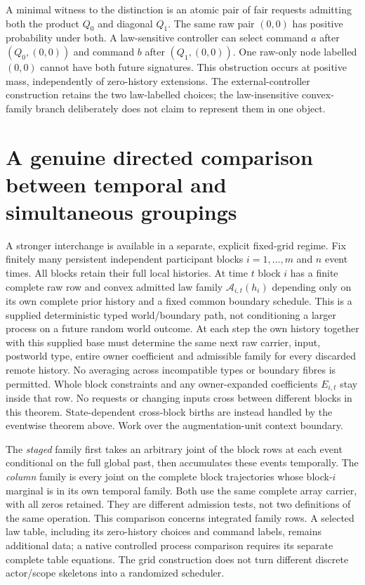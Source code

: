 \documentclass[11pt]{article}\usepackage{amsmath,amssymb,amsthm,geometry}\geometry{margin=1in}
\begin{document}
A minimal witness to the distinction is an atomic pair of fair requests admitting both the product $Q_0$ and diagonal $Q_1$. The same raw pair $(0,0)$ has positive probability under both. A law-sensitive controller can select command $a$ after $(Q_0,(0,0))$ and command $b$ after $(Q_1,(0,0))$. One raw-only node labelled $(0,0)$ cannot have both future signatures. This obstruction occurs at positive mass, independently of zero-history extensions. The external-controller construction retains the two law-labelled choices; the law-insensitive convex-family branch deliberately does not claim to represent them in one object.

\section{A genuine directed comparison between temporal and simultaneous groupings}
A stronger interchange is available in a separate, explicit fixed-grid regime. Fix finitely many persistent independent participant blocks $i=1,\ldots,m$ and $n$ event times. All blocks retain their full local histories. At time $t$ block $i$ has a finite complete raw row and convex admitted law family $\mathcal A_{i,t}(h_i)$ depending only on its own complete prior history and a fixed common boundary schedule. This is a supplied deterministic typed world/boundary path, not conditioning a larger process on a future random world outcome. At each step the own history together with this supplied base must determine the same next raw carrier, input, postworld type, entire owner coefficient and admissible family for every discarded remote history. No averaging across incompatible types or boundary fibres is permitted. Whole block constraints and any owner-expanded coefficients $E_{i,t}$ stay inside that row. No requests or changing inputs cross between different blocks in this theorem. State-dependent cross-block births are instead handled by the eventwise theorem above. Work over the augmentation-unit context boundary.

The \emph{staged} family first takes an arbitrary joint of the block rows at each event conditional on the full global past, then accumulates these events temporally. The \emph{column} family is every joint on the complete block trajectories whose block-$i$ marginal is in its own temporal family. Both use the same complete array carrier, with all zeros retained. They are different admission tests, not two definitions of the same operation. This comparison concerns integrated family rows. A selected law table, including its zero-history choices and command labels, remains additional data; a native controlled process comparison requires its separate complete table equations. The grid construction does not turn different discrete actor/scope skeletons into a randomized scheduler.
\end{document}
